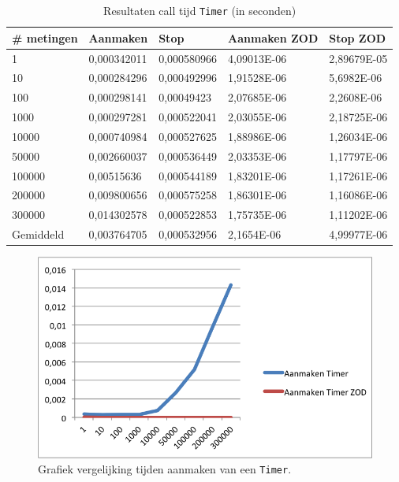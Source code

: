 \begin{table}[]
\centering
\begin{tabular}{|l|l|l|l|l|}
\hline
\# metingen   & Aanmaken    & Stop        & Aanmaken ZOD & Stop ZOD    \\ \hline
1         & 0,000342011 & 0,000580966 & 4,09013E-06  & 2,89679E-05 \\ \hline
10        & 0,000284296 & 0,000492996 & 1,91528E-06  & 5,6982E-06  \\ \hline
100       & 0,000298141 & 0,00049423  & 2,07685E-06  & 2,2608E-06  \\ \hline
1000      & 0,000297281 & 0,000522041 & 2,03055E-06  & 2,18725E-06 \\ \hline
10000     & 0,000740984 & 0,000527625 & 1,88986E-06  & 1,26034E-06 \\ \hline
50000     & 0,002660037 & 0,000536449 & 2,03353E-06  & 1,17797E-06 \\ \hline
100000    & 0,00515636  & 0,000544189 & 1,83201E-06  & 1,17261E-06 \\ \hline
200000    & 0,009800656 & 0,000575258 & 1,86301E-06  & 1,16086E-06 \\ \hline
300000    & 0,014302578 & 0,000522853 & 1,75735E-06  & 1,11202E-06 \\ \hline
Gemiddeld & 0,003764705 & 0,000532956 & 2,1654E-06   & 4,99977E-06 \\ \hline
\end{tabular}
\caption{Resultaten call tijd \texttt{Timer} (in seconden)}
\label{Table:Timer}
\end{table}

\begin{figure}[!h]
  \centering
  \includegraphics[scale=1.0]{Afbeeldingen/Evaluatie/AanmakenTimer}
  \caption{Grafiek vergelijking tijden aanmaken van een \texttt{Timer}.}
  \label{fig:GraphTimer}
\end{figure}

